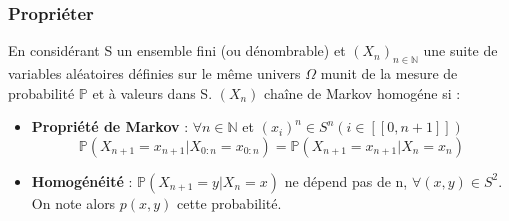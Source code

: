 \begin{frame}
    \frametitle{Propriéter}

        En considérant S un ensemble fini (ou dénombrable) et $(X_n)_{n \in \mathbb{N}}$ une suite de variables aléatoires définies sur le même univers $\Omega$ munit de la mesure de probabilité $\mathbb{P}$ et à valeurs dans S. $(X_n)$ chaîne de Markov homogéne si :

        \begin{itemize}
            \item \textbf{Propriété de Markov} : $\forall n \in \mathbb{N}$ et $(x_i)^n \in S^n (i \in [[0, n+1]])$ \\
            $$ \mathbb{P}(X_{n+1} = x_{n+1} | X_{0:n} = x_{0:n}) = \mathbb{P}(X_{n+1} = x_{n+1} | X_n = x_n) $$
            \item \textbf{Homogénéité} : $\mathbb{P}(X_{n+1} = y | X_n = x)$ ne dépend pas de n, $\forall (x, y) \in S^2$. On note alors $p(x, y)$ cette probabilité.
        \end{itemize}
\end{frame}
